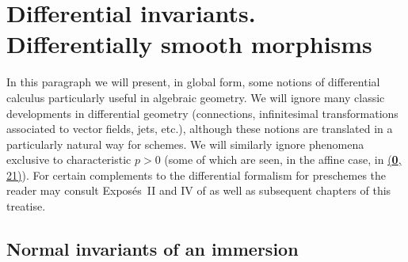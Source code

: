 \setcounter{section}{15}
\section{Differential invariants. Differentially smooth morphisms}
\label{section:IV.16}

In this paragraph we will present, in global form, some notions of differential calculus particularly useful in algebraic geometry.
We will ignore many classic developments in differential geometry (connections, infinitesimal transformations associated to vector fields, jets, etc.), although these notions are translated in a particularly natural way for schemes.
We will similarly ignore phenomena exclusive to characteristic $p>0$ (some of which are seen, in the affine case, in \hyperref[section:0.21]{(\textbf{0}, 21)}).
For certain complements to the differential formalism for preschemes the reader may consult Expos\'es~II and IV of \cite{SGA3} as well as subsequent chapters of this treatise. 


\subsection{Normal invariants of an immersion}
\label{IV.16.1}

\begin{env}[16.1.1]
\label{IV.16.1.1}
\end{env}
